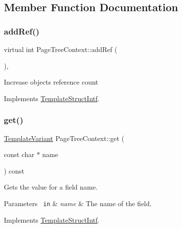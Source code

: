 \subsection{Member Function Documentation}
\mbox{\label{class_page_tree_context_ab0c3eb857f63c20d9bbc8b65223d052c}} 
\subsubsection{\texorpdfstring{addRef()}{addRef()}}
{\footnotesize\ttfamily virtual int Page\+Tree\+Context\+::add\+Ref (\begin{DoxyParamCaption}{ }\end{DoxyParamCaption})\hspace{0.3cm}{\ttfamily [inline]}, {\ttfamily [virtual]}}

Increase object\textquotesingle{}s reference count 

Implements \mbox{\hyperlink{class_template_struct_intf_a05fe97ad47633beb326f69686faed581}{Template\+Struct\+Intf}}.

\mbox{\label{class_page_tree_context_ae4f5bf1ae906fd0b23b1ca48b79bf288}} 
\subsubsection{\texorpdfstring{get()}{get()}}
{\footnotesize\ttfamily \mbox{\hyperlink{class_template_variant}{Template\+Variant}} Page\+Tree\+Context\+::get (\begin{DoxyParamCaption}\item[{const char $\ast$}]{name }\end{DoxyParamCaption}) const\hspace{0.3cm}{\ttfamily [virtual]}}

Gets the value for a field name. 
\begin{DoxyParams}[1]{Parameters}
\mbox{\texttt{ in}}  & {\em name} & The name of the field. \\
\hline
\end{DoxyParams}


Implements \mbox{\hyperlink{class_template_struct_intf_a3d610cb81b4adbb531ebed3aa3d09b51}{Template\+Struct\+Intf}}.

